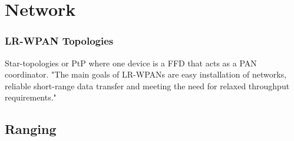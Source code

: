 \section{Network}
\label{s:network}

\subsubsection{LR-WPAN Topologies}
Star-topologies or PtP where one device is a FFD that acts as a PAN coordinator.
"The main goals of LR-WPANs are easy installation of networks, reliable short-range data transfer and meeting the need for relaxed throughput requirements."

\subsection{Ranging}